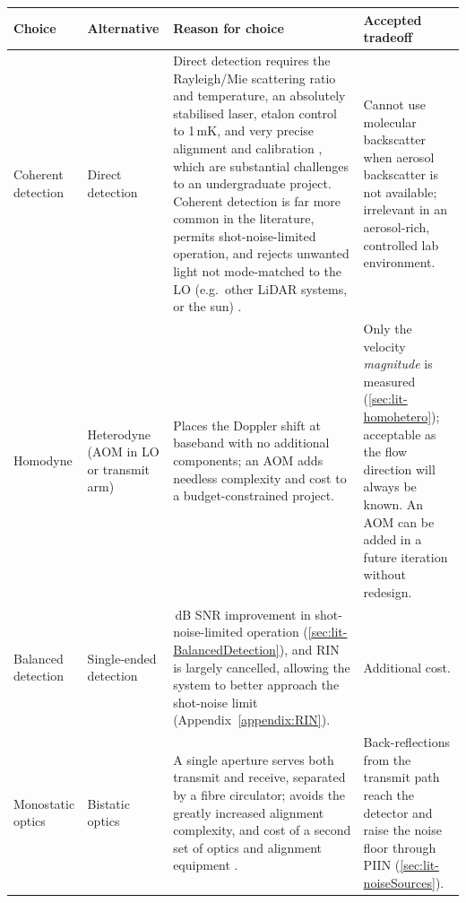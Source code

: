 \begin{table}[H]
	\centering
	\small
	\setlength{\tabcolsep}{4pt}
	\renewcommand{\arraystretch}{1.15}
	\begin{tabular}{@{}>{\raggedright\arraybackslash}p{}
			>{\raggedright\arraybackslash}p{}
			>{\raggedright\arraybackslash}p{}
			>{\raggedright\arraybackslash}p{}@{}}
		\toprule
		\textbf{Choice} & \textbf{Alternative} & \textbf{Reason for choice} & \textbf{Accepted tradeoff} \\
		\midrule
		Coherent detection & Direct detection &
		Direct detection requires the Rayleigh/Mie scattering ratio and temperature, an absolutely stabilised laser, etalon control to 1\,mK, and very precise alignment and calibration \cite{korb_theory_1998,colberg_diode-laser-based_2026,werner_doppler_2005}, which are substantial challenges to an undergraduate project. Coherent detection is far more common in the literature, permits shot-noise-limited operation, and rejects unwanted light not mode-matched to the LO (e.g.\ other LiDAR systems, or the sun) \cite{hill_remote_nodate}. &
		Cannot use molecular backscatter when aerosol backscatter is not available; irrelevant in an aerosol-rich, controlled lab environment. \\
		\addlinespace[3pt]
		Homodyne & Heterodyne (AOM in LO or transmit arm) \cite{harris_role_1998,abdelazim_development_2015} &
		Places the Doppler shift at baseband with no additional components; an AOM adds needless complexity and cost to a budget-constrained project. &
		Only the velocity \emph{magnitude} is measured (\autoref{sec:lit-homohetero}); acceptable as the flow direction will always be known. An AOM can be added in a future iteration without redesign. \\
		\addlinespace[3pt]
		Balanced detection & Single-ended detection &
		3\,dB SNR improvement in shot-noise-limited operation (\autoref{sec:lit-BalancedDetection}), and RIN is largely cancelled, allowing the system to better approach the shot-noise limit (Appendix~\ref{appendix:RIN}). &
		Additional cost. \\
		\addlinespace[3pt]
		Monostatic optics & Bistatic optics &
		A single aperture serves both transmit and receive, separated by a fibre circulator; avoids the greatly increased alignment complexity, and cost of a second set of optics and alignment equipment \cite{cariou2006laser,harris_role_1998,bennett_doppler_2003}. &
		Back-reflections from the transmit path reach the detector and raise the noise floor through PIIN (\autoref{sec:lit-noiseSources}). \\

\end{tabular}
\end{table}
